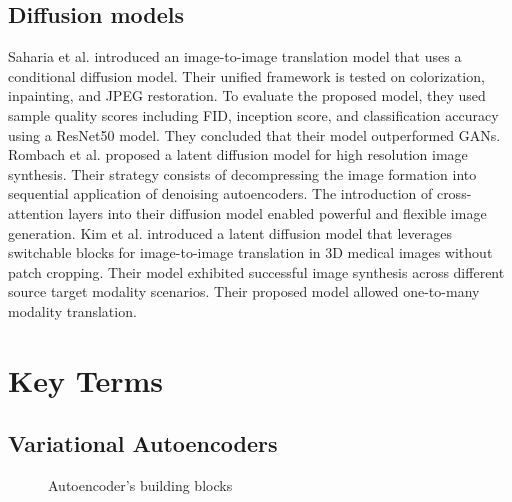 \documentclass[11pt]{article}
\begin{document}
 \subsection{Diffusion models}
Saharia et al. \cite{saharia2022palette} introduced an image-to-image translation model that uses a conditional diffusion model. Their unified framework is tested on colorization, inpainting, and JPEG restoration. To evaluate the proposed model, they used sample quality scores including FID, inception score, and classification accuracy using a ResNet50 model. They concluded that their model outperformed GANs. 
Rombach et al. \cite{Rombach_2022_CVPR} proposed a latent diffusion model for high resolution image synthesis. Their strategy consists of decompressing the image formation into sequential application of denoising autoencoders. The introduction of cross-attention layers into their diffusion model enabled powerful and flexible image generation. 
Kim et al. \cite{Kim_2024_WACV} introduced a latent diffusion model that leverages switchable blocks for image-to-image translation in 3D medical images without patch cropping. Their model exhibited successful image synthesis across different source target modality scenarios. Their proposed model allowed one-to-many modality translation.
\section{Key Terms}
 \subsection{Variational Autoencoders}


\begin{figure}[h!]
        \centering
      \caption{Autoencoder's building blocks}
      \end{figure}
    
\end{document}
